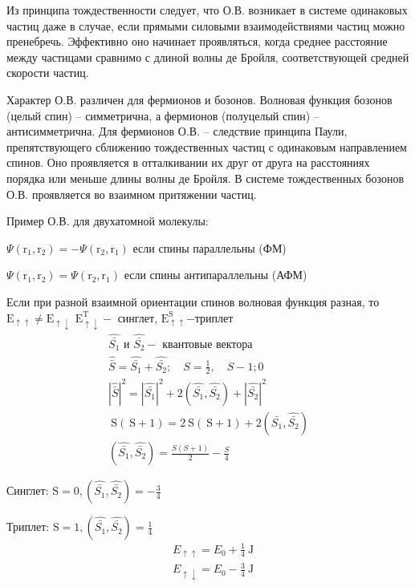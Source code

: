 Из принципа тождественности следует, что О.В. возникает в системе одинаковых частиц даже в случае, если прямыми силовыми взаимодействиями частиц можно пренебречь. Эффективно оно начинает проявляться, когда среднее расстояние между частицами сравнимо с длиной волны де Бройля, соответствующей средней скорости частиц.


Характер О.В. различен для фермионов и бозонов. Волновая функция бозонов (целый спин) – симметрична, а фермионов (полуцелый спин) – антисимметрична. Для фермионов О.В. – следствие принципа Паули, препятствующего сближению тождественных частиц с одинаковым направлением спинов. Оно проявляется в
отталкивании их друг от друга на расстояниях порядка или меньше длины волны де Бройля. В системе тождественных бозонов О.В. проявляется во взаимном притяжении частиц.


Пример О.В. для двухатомной молекулы:


$\Psi\left(\mathrm{r}_1, \mathrm{r}_2\right)=-\Psi\left(\mathrm{r}_2, \mathrm{r}_1\right)$ если спины параллельны (ФМ)


$\Psi\left(\mathrm{r}_1, \mathrm{r}_2\right)=\Psi\left(\mathrm{r}_2, \mathrm{r}_1\right)$ если спины антипараллельны (АФМ)


Если при разной взаимной ориентации спинов волновая функция разная, то $\mathrm{E}_{\uparrow \uparrow} \neq \mathrm{E}_{\uparrow \downarrow}$ $\mathrm{E}_{\uparrow \downarrow}^{\mathrm{T}}-$ синглет, $\mathrm{E}_{\uparrow \uparrow}^{\mathrm{S}}{- \text {триплет }}$
$$
\begin{gathered}
 \hat{\bar{S_1}} \text { и } \hat{\bar{S_2}}-\text { квантовые вектора } \\
 \hat{\bar{S}}= \hat{\bar{S_1}} +  \hat{\bar{S_2}} ; \quad S=\frac{1}{2}, \quad S-1 ; 0 \\
|\hat{\bar{S}}|^2=\left| \hat{\bar{S_1}}\right|^2+2\left( \hat{\bar{S_1}},  \hat{\bar{S_2}}\right)+\left| \hat{\bar{S_2}}\right|^2 \\
\mathrm{~S}(\mathrm{~S}+1)=2 \mathrm{~S}(\mathrm{~S}+1)+2\left( \hat{\bar{S_1}},  \hat{\bar{S_2}}\right) \\
\left( \hat{\bar{S_1}}, \hat{\bar{S_2}}\right)=\frac{S(S+1)}{2}-\frac{S}{4}
\end{gathered}
$$


Синглет: $\mathrm{S}=0,\left( \hat{\bar{S_1}}, \hat{\bar{S_2}}\right)=-\frac{3}{4}$


Триплет: $\mathrm{S}=1,\left( \hat{\bar{S_1}},  \hat{\bar{S_2}}\right)=\frac{1}{4}$
$$
\begin{aligned}
& E_{\uparrow \uparrow}=E_0+ \frac{1}{4} \mathrm{~J} \\
& E_{\uparrow \downarrow}=E_0- \frac{3}{4} \mathrm{~J}
\end{aligned}
$$


